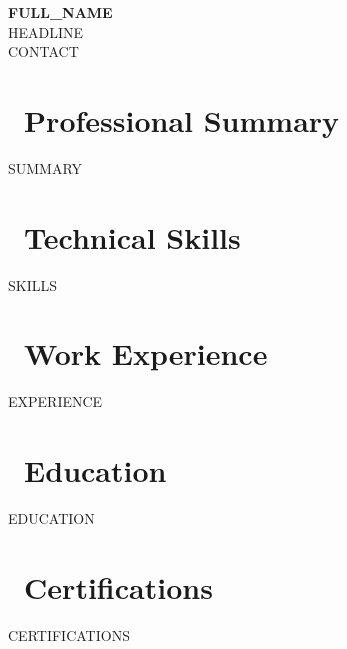 \documentclass[10pt, letterpaper]{article}
\begin{document}
\noindent{}
\vspace{0.18in}
\hspace{0.6in}\begin{minipage}{\dimexpr\paperwidth-1.2in\relax}
{\fontsize{22}{26}\bfseries\color{white} \MakeUppercase{{{FULL_NAME}}}}\\[3pt]
{\fontsize{10.5}{13}\color{white} {{HEADLINE}}}\\[6pt]
{\color{white}\fontsize{9}{11}\selectfont
{{CONTACT}}
}
\end{minipage}
\vspace{0.55in}

\hspace{0.6in}\begin{minipage}{\dimexpr\paperwidth-1.2in\relax}

\section{\faUser\ Professional Summary}
{\fontsize{9}{13}\color{textmain}
{{SUMMARY}}}

\section{\faCogs\ Technical Skills}
\vspace{2pt}
{{SKILLS}}
\vspace{4pt}

\section{\faBriefcase\ Work Experience}

{{EXPERIENCE}}

\vspace{3pt}
\section{\faGraduationCap\ Education}
{{EDUCATION}}

\vspace{3pt}
\section{\faCertificate\ Certifications}
{{CERTIFICATIONS}}

\end{minipage}
\end{document}
